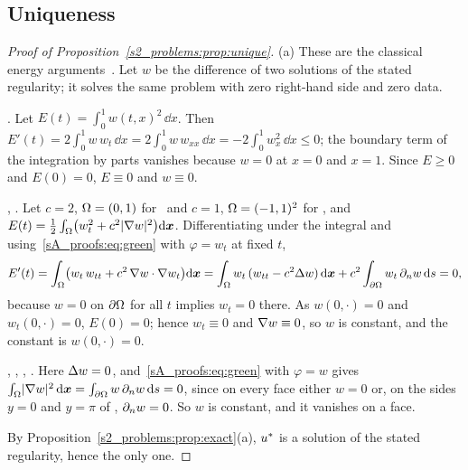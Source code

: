 \subsection{Uniqueness}\label{sA_proofs:sec:unique}

\begin{proof}[Proof of Proposition~\ref{s2_problems:prop:unique}]
(a) These are the classical energy
arguments~\citep[Secs~2.2.5, 2.3.4, 2.4.3]{evans2010}. Let $w$ be the difference of two
solutions of the stated regularity; it solves the same problem with zero right-hand side
and zero data.

\PH. Let $E(t)=\int_0^1w(t,x)^2\,\dd x$. Then
$E'(t)=2\int_0^1w\,w_t\,\dd x=2\int_0^1w\,w_{xx}\,\dd x=-2\int_0^1w_x^2\,\dd x\le0$; the
boundary term of the integration by parts vanishes because $w=0$ at $x=0$ and $x=1$. Since
$E\ge0$ and $E(0)=0$, $E\equiv0$ and $w\equiv0$.

\PWone, \PWtwo. Let $c=2$, $\Omega=(0,1)$ for \PWone\ and $c=1$, $\Omega=(-1,1)^2$ for \PWtwo,
and $E(t)=\tfrac12\int_\Omega\bigl(w_t^2+c^2\lvert \nabla w\rvert^2\bigr)\mathrm{d}\boldsymbol{x}$. Differentiating under
the integral and using~\eqref{sA_proofs:eq:green} with $\varphi=w_t$ at fixed $t$,
\[
E'(t)=\int_\Omega\bigl(w_t\,w_{tt}+c^2\,\nabla w\cdot\nabla w_t\bigr)\mathrm{d}\boldsymbol{x}
=\int_\Omega w_t\,(w_{tt}-c^2\Delta w)\,\mathrm{d}\boldsymbol{x}+c^2\int_{\partial\Omega}w_t\,\partial_n w\,\mathrm{d} s=0,
\]
because $w=0$ on $\partial\Omega$ for all $t$ implies $w_t=0$ there. As $w(0,\cdot)=0$ and
$w_t(0,\cdot)=0$, $E(0)=0$; hence $w_t\equiv0$ and $\nabla w\equiv0$, so $w$ is constant,
and the constant is $w(0,\cdot)=0$.

\PLtwo, \PLthreeS, \Pone, \Ptwo. Here $\Delta w=0$, and~\eqref{sA_proofs:eq:green} with
$\varphi=w$ gives $\int_\Omega\lvert \nabla w\rvert^2\,\mathrm{d}\boldsymbol{x}=\int_{\partial\Omega}w\,\partial_n w\,\mathrm{d} s=0$, since on
every face either $w=0$ or, on the sides $y=0$ and $y=\pi$ of \PLtwo, $\partial_n w=0$. So $w$ is
constant, and it vanishes on a face.

By Proposition~\ref{s2_problems:prop:exact}(a), $u^{*}$ is a solution of the stated
regularity, hence the only one.


\end{proof}
